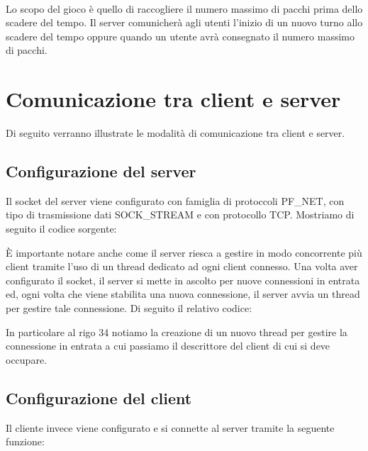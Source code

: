 \documentclass[a4paper]{article}
\begin{document}
\paragraph{}
Lo scopo del gioco è quello di raccogliere il numero massimo di pacchi prima dello scadere del tempo.
Il server comunicherà agli utenti l'inizio di un nuovo turno allo scadere del tempo oppure quando un
utente avrà consegnato il numero massimo di pacchi.





\pagebreak
\section{Comunicazione tra client e server}
Di seguito verranno illustrate le modalità di comunicazione tra client e server.
\subsection{Configurazione del server}
Il socket del server viene configurato con famiglia di protoccoli PF\_NET, con tipo di trasmissione dati SOCK\_STREAM e con protocollo TCP. Mostriamo di seguito il codice sorgente:


È importante notare anche come il server riesca a gestire in modo concorrente più client tramite l'uso di un thread dedicato ad ogni client connesso. 
Una volta aver configurato il socket, il server si mette in ascolto per nuove connessioni in entrata ed, ogni volta che
viene stabilita una nuova connessione, il server avvia un thread per gestire tale connessione. Di seguito il relativo codice: 



In particolare al rigo 34 notiamo la creazione di un nuovo thread per gestire la connessione in entrata a cui passiamo il descrittore del client di cui si deve occupare.


\subsection{Configurazione del client}
Il cliente invece viene configurato e si connette al server tramite la seguente funzione:

\end{document}
